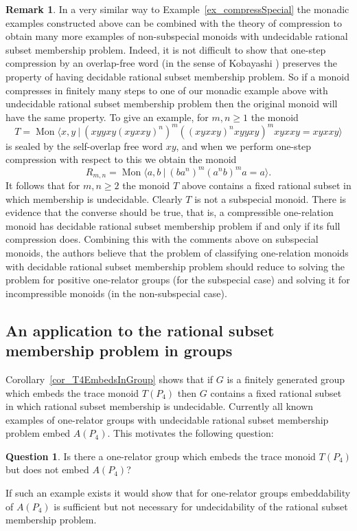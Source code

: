 \documentclass{amsart}
\newcommand{\Mpres}[2]{\operatorname{Mon}\bigl\langle #1\:|\:#2 \bigr\rangle}
\newcommand{\M}{R_{m,n}}
\theoremstyle{plain}
\theoremstyle{definition}
\newtheorem{question}[theorem]{Question}
\newtheorem{remark}[theorem]{Remark}
\begin{document}
\begin{remark} 
In a very similar way to Example~\ref{ex_compressSpecial} the monadic examples constructed above can be combined with the theory of compression 
\cite{Lallement1974, Kobayashi2000}
to obtain many more examples of non-subspecial monoids with undecidable rational subset membership problem. Indeed, it is not difficult to show that one-step compression by an overlap-free word (in the sense of Kobayashi \cite{Kobayashi2000}) preserves the property of having decidable rational subset membership problem. So if a monoid compresses in finitely many steps to one of our monadic example above with undecidable rational subset membership problem then the original monoid will have the same property. To give an example, for $m,n \geq 1$ the monoid   
\[
T = \Mpres{x, y}{(xyyxy (xyxxy)^n)^m((xyxxy)^n xyyxy)^m  xyxxy=  xyxxy}
\]
is sealed by the self-overlap free word $xy$, and when we perform one-step compression with respect to this we obtain the monoid   
\[
\M= \Mpres{a, b}{(b a^n)^m(a^n b)^ma = a}. 
\]
It follows that for $m,n \geq 2$ the monoid $T$ above contains a fixed rational subset in which membership is undecidable. Clearly $T$ is not a subspecial monoid.   
There is evidence that the converse should be true, that is, a compressible one-relation monoid has decidable rational subset membership problem if and only if its full compression does.
Combining this with the comments above on subspecial monoids, the authors believe that the problem of classifying one-relation monoids with decidable rational subset membership problem should reduce to solving the problem for positive one-relator groups (for the subspecial case) and solving it for incompressible monoids (in the non-subspecial case).    
\end{remark}

\subsection{An application to the rational subset membership problem in groups}


Corollary~\ref{cor_T4EmbedsInGroup} shows that if $G$ is a finitely generated group which embeds the trace monoid $T(P_4)$ then $G$ contains a fixed rational subset in which rational subset membership is undecidable. 
Currently all known examples of one-relator groups with undecidable rational subset membership problem embed $A(P_4)$. This motivates the following question: 

 \begin{question} 
Is there a one-relator group which embeds the trace monoid $T(P_4)$ but does not embed $A(P_4)$?
  \end{question}
\noindent If such an example exists it would show that for one-relator groups embeddability of $A(P_4)$ is sufficient but not necessary for undecidability of the rational subset membership problem. 
\end{document}
